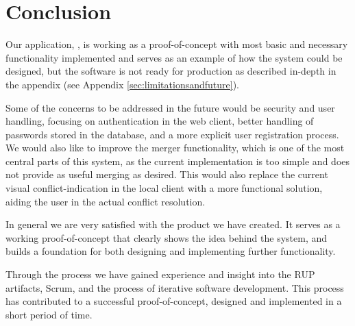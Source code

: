 \section{Conclusion}
Our application, \SOP{}, is working as a proof-of-concept with most basic and necessary functionality implemented and serves as an example of how the system could be designed, but the software is not ready for production as described in-depth in the appendix (see Appendix \ref{sec:limitationsandfuture}).

Some of the concerns to be addressed in the future would be security and user handling, focusing on authentication in the web client, better handling of passwords stored in the database, and a more explicit user registration process. We would also like to improve the merger functionality, which is one of the most central parts of this system, as the current implementation is too simple and does not provide as useful merging as desired. This would also replace the current visual conflict-indication in the local client with a more functional solution, aiding the user in the actual conflict resolution.

In general we are very satisfied with the product we have created. It serves as a working proof-of-concept that clearly shows the idea behind the \SOP{} system, and builds a foundation for both designing and implementing further functionality. 

Through the process we have gained experience and insight into the RUP artifacts, Scrum, and the process of iterative software development. This process has contributed to a successful proof-of-concept, designed and implemented in a short period of time.
